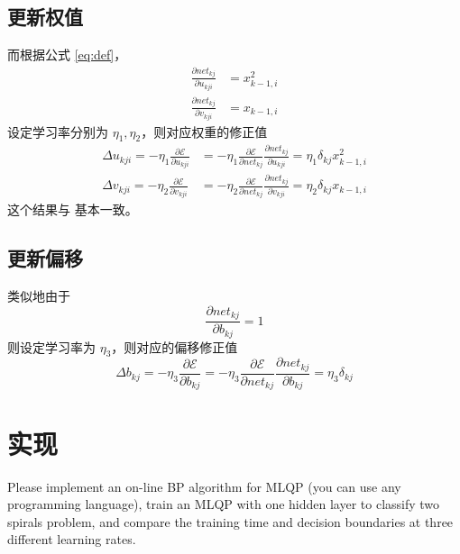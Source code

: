     \subsection{更新权值}
    而根据公式 \eqref{eq:def}，
    \begin{align*}
        \frac{\partial\mathit{net}_{kj}}{\partial u_{kji}} &= x_{k-1,i}^2 \\
        \frac{\partial\mathit{net}_{kj}}{\partial v_{kji}} &= x_{k-1,i}
    \end{align*}
    设定学习率分别为 $\eta_1,\eta_2$，则对应权重的修正值
    \begin{align}
        \Delta u_{kji} = -\eta_1\frac{\partial\mathcal{E}}{\partial u_{kji}} 
        &=-\eta_1\frac{\partial\mathcal{E}}{\partial\mathit{net}_{kj}}\frac{\partial\mathit{net}_{kj}}{\partial u_{kji}}=\eta_1\delta_{kj}x_{k-1,i}^2 \label{eq:u}\\
        \Delta v_{kji} = -\eta_2\frac{\partial\mathcal{E}}{\partial v_{kji}} &=-\eta_2\frac{\partial\mathcal{E}}{\partial\mathit{net}_{kj}}\frac{\partial\mathit{net}_{kj}}{\partial v_{kji}}= \eta_2\delta_{kj}x_{k-1,i} \label{eq:v}
    \end{align}
    这个结果与 \cite{MLQP} 基本一致。

    \subsection{更新偏移}

    类似地由于
    \begin{equation*}
        \frac{\partial\mathit{net}_{kj}}{\partial b_{kj}} = 1
    \end{equation*}
    则设定学习率为 $\eta_3$，则对应的偏移修正值
    \begin{equation}\label{eq:bias}
        \Delta b_{kj} = -\eta_3\frac{\partial\mathcal{E}}{\partial b_{kj}}  = -\eta_3\frac{\partial\mathcal{E}}{\partial\mathit{net}_{kj}}\frac{\partial\mathit{net}_{kj}}{\partial b_{kj}} = \eta_3\delta_{kj}
    \end{equation}

    \section{实现}
    \begin{problem}
        Please implement an on-line BP algorithm for MLQP
(you can use any programming language), train an MLQP
with one hidden layer to classify two spirals problem,
and compare the training time and decision boundaries at
three different learning rates.
    \end{problem}

